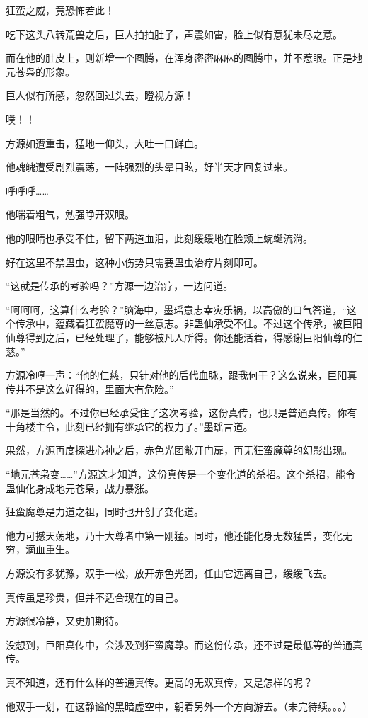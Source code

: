 \begin{this_body}
狂蛮之威，竟恐怖若此！

吃下这头八转荒兽之后，巨人拍拍肚子，声震如雷，脸上似有意犹未尽之意。

而在他的肚皮上，则新增一个图腾，在浑身密密麻麻的图腾中，并不惹眼。正是地元苍枭的形象。

巨人似有所感，忽然回过头去，瞪视方源！

噗！！

方源如遭重击，猛地一仰头，大吐一口鲜血。

他魂魄遭受剧烈震荡，一阵强烈的头晕目眩，好半天才回复过来。

呼呼呼……

他喘着粗气，勉强睁开双眼。

他的眼睛也承受不住，留下两道血泪，此刻缓缓地在脸颊上蜿蜒流淌。

好在这里不禁蛊虫，这种小伤势只需要蛊虫治疗片刻即可。

“这就是传承的考验吗？”方源一边治疗，一边问道。

“呵呵呵，这算什么考验？”脑海中，墨瑶意志幸灾乐祸，以高傲的口气答道，“这个传承中，蕴藏着狂蛮魔尊的一丝意志。非蛊仙承受不住。不过这个传承，被巨阳仙尊得到之后，已经处理了，能够被凡人所得。你还能活着，得感谢巨阳仙尊的仁慈。”

方源冷哼一声：“他的仁慈，只针对他的后代血脉，跟我何干？这么说来，巨阳真传并不是这么好得的，里面大有危险。”

“那是当然的。不过你已经承受住了这次考验，这份真传，也只是普通真传。你有十角楼主令，此刻已经拥有继承它的权力了。”墨瑶言道。

果然，方源再度探进心神之后，赤色光团敞开门扉，再无狂蛮魔尊的幻影出现。

“地元苍枭变……”方源这才知道，这份真传是一个变化道的杀招。这个杀招，能令蛊仙化身成地元苍枭，战力暴涨。

狂蛮魔尊是力道之祖，同时也开创了变化道。

他力可撼天荡地，乃十大尊者中第一刚猛。同时，他还能化身无数猛兽，变化无穷，滴血重生。

方源没有多犹豫，双手一松，放开赤色光团，任由它远离自己，缓缓飞去。

真传虽是珍贵，但并不适合现在的自己。

方源很冷静，又更加期待。

没想到，巨阳真传中，会涉及到狂蛮魔尊。而这份传承，还不过是最低等的普通真传。

真不知道，还有什么样的普通真传。更高的无双真传，又是怎样的呢？

他双手一划，在这静谧的黑暗虚空中，朝着另外一个方向游去。（未完待续。。。）

\end{this_body}


